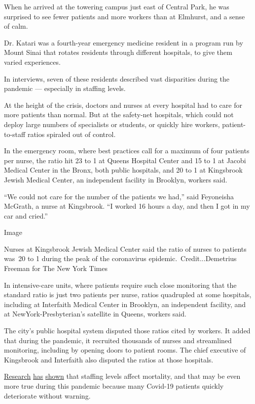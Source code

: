 When he arrived at the towering campus just east of Central Park, he was
surprised to see fewer patients and more workers than at Elmhurst, and a
sense of calm.

Dr. Katari was a fourth-year emergency medicine resident in a program
run by Mount Sinai that rotates residents through different hospitals,
to give them varied experiences.

In interviews, seven of these residents described vast disparities
during the pandemic --- especially in staffing levels.

At the height of the crisis, doctors and nurses at every hospital had to
care for more patients than normal. But at the safety-net hospitals,
which could not deploy large numbers of specialists or students, or
quickly hire workers, patient-to-staff ratios spiraled out of control.

In the emergency room, where best practices call for a maximum of four
patients per nurse, the ratio hit 23 to 1 at Queens Hospital Center and
15 to 1 at Jacobi Medical Center in the Bronx, both public hospitals,
and 20 to 1 at Kingsbrook Jewish Medical Center, an independent facility
in Brooklyn, workers said.

``We could not care for the number of the patients we had,'' said
Feyoneisha McGrath, a nurse at Kingsbrook. ``I worked 16 hours a day,
and then I got in my car and cried.''

Image

Nurses at Kingsbrook Jewish Medical Center said the ratio of nurses to
patients was~20 to 1 during the peak of the coronavirus
epidemic.~Credit...Demetrius Freeman for The New York Times

In intensive-care units, where patients require such close monitoring
that the standard ratio is just two patients per nurse, ratios
quadrupled at some hospitals, including at Interfaith Medical Center in
Brooklyn, an independent facility, and at NewYork-Presbyterian's
satellite in Queens, workers said.

The city's public hospital system disputed those ratios cited by
workers. It added that during the pandemic, it recruited thousands of
nurses and streamlined monitoring, including by opening doors to patient
rooms. The chief executive of Kingsbrook and Interfaith also disputed
the ratios at those hospitals.

\href{https://www.ncbi.nlm.nih.gov/pubmed/29110907}{Research}
\href{https://psnet.ahrq.gov/primer/nursing-and-patient-safety}{has}
\href{https://patientengagementhit.com/news/how-nurse-staffing-ratios-impact-patient-safety-access-to-care}{shown}
that staffing levels affect mortality, and that may be even more true
during this pandemic because many Covid-19 patients quickly deteriorate
without warning.

